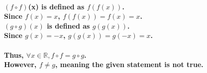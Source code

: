 \documentclass{article}
\begin{document}
\paragraph{\large
\((f \circ f)\)(x) is  defined as \(f(f(x))\).
\\\indent Since \(f(x) = x\), \(f(f(x)) = f(x) = x\).
\\ \((g \circ g)(x)\) is defined as \(g(g(x))\).
\\\indent Since \(g(x) = -x\), \(g(g(x)) = g(-x) = x\).}

\paragraph{\large
Thus, \(\forall x \in \mathds{R}, f \circ f = g \circ g\).
\\ However, \(f \neq g\), meaning the given statement is not true.}
\end{document}
